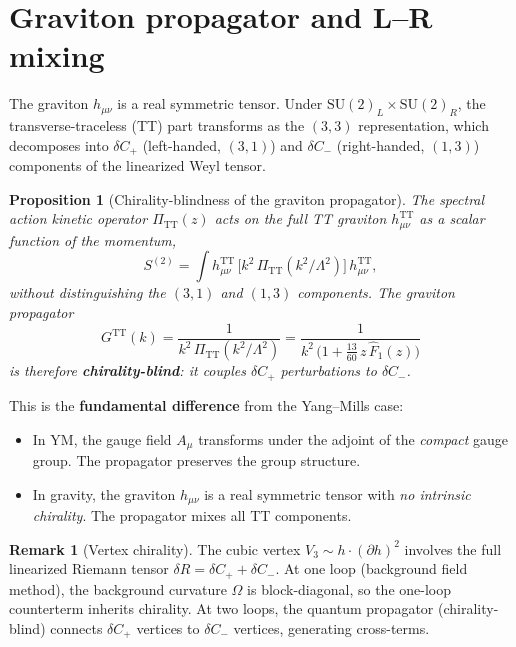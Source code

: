 \documentclass[11pt,a4paper]{article}
\newcommand{\PiTT}{\Pi_{\mathrm{TT}}}
\newcommand{\Fhat}{\hat{F}}
\newtheorem{proposition}[theorem]{Proposition}
\theoremstyle{definition}
\newtheorem{remark}[theorem]{Remark}
\begin{document}
\section{Graviton propagator and L--R mixing}\label{sec:graviton}

The graviton $h_{\mu\nu}$ is a real symmetric tensor.  Under
$\mathrm{SU}(2)_L \times \mathrm{SU}(2)_R$, the transverse-traceless (TT)
part transforms as the $(3,3)$ representation, which decomposes into
$\delta C_+$ (left-handed, $(3,1)$) and $\delta C_-$ (right-handed, $(1,3)$)
components of the linearized Weyl tensor.

\begin{proposition}[Chirality-blindness of the graviton propagator]
\label{prop:graviton-blind}
The spectral action kinetic operator $\PiTT(z)$ acts on the \emph{full} TT
graviton $h^{\mathrm{TT}}_{\mu\nu}$ as a scalar function of the momentum,
\begin{equation}\label{eq:Pi-TT}
  S^{(2)} = \int h^{\mathrm{TT}}_{\mu\nu}\,
  \bigl[k^2\,\PiTT(k^2/\Lambda^2)\bigr]\,
  h^{\mathrm{TT}}_{\mu\nu},
\end{equation}
without distinguishing the $(3,1)$ and $(1,3)$ components.  The graviton
propagator
\begin{equation}\label{eq:graviton-propagator}
  G^{\mathrm{TT}}(k)
  = \frac{1}{k^2\,\PiTT(k^2/\Lambda^2)}
  = \frac{1}{k^2\,\bigl(1 + \tfrac{13}{60}\,z\,\Fhat_1(z)\bigr)}
\end{equation}
is therefore \textbf{chirality-blind}: it couples $\delta C_+$ perturbations
to $\delta C_-$.
\end{proposition}

This is the \textbf{fundamental difference} from the Yang--Mills case:
\begin{itemize}
\item In YM, the gauge field $A_\mu$ transforms under the adjoint of the
  \emph{compact} gauge group. The propagator preserves the group structure.
\item In gravity, the graviton $h_{\mu\nu}$ is a real symmetric tensor with
  \emph{no intrinsic chirality}.  The propagator mixes all TT components.
\end{itemize}

\begin{remark}[Vertex chirality]
The cubic vertex $V_3 \sim h \cdot (\partial h)^2$ involves the full linearized
Riemann tensor $\delta R = \delta C_+ + \delta C_-$.  At one loop (background
field method), the background curvature $\Omega$ is block-diagonal, so the
one-loop counterterm inherits chirality.  At two loops, the quantum propagator
(chirality-blind) connects $\delta C_+$ vertices to $\delta C_-$ vertices,
generating cross-terms.
\end{remark}
\end{document}
